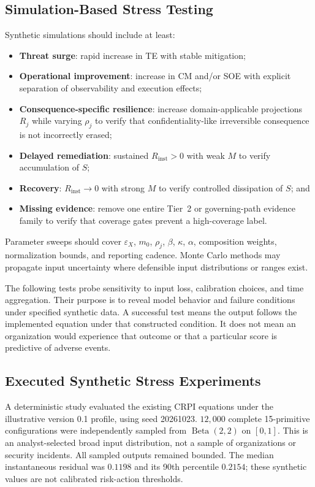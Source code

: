 \documentclass[11pt]{article}
\begin{document}
\subsection{Simulation-Based Stress Testing}
Synthetic simulations should include at least:
\begin{itemize}
  \item \textbf{Threat surge}: rapid increase in TE with stable mitigation;
  \item \textbf{Operational improvement}: increase in CM and/or SOE with explicit
    separation of observability and execution effects;
  \item \textbf{Consequence-specific resilience}: increase domain-applicable
    projections $R_j$ while varying $\rho_j$ to verify that confidentiality-like
    irreversible consequence is not incorrectly erased;
  \item \textbf{Delayed remediation}: sustained $R_{\mathrm{inst}}>0$ with weak $M$ to
    verify accumulation of $S$;
  \item \textbf{Recovery}: $R_{\mathrm{inst}}\rightarrow0$ with strong $M$ to verify
    controlled dissipation of $S$; and
  \item \textbf{Missing evidence}: remove one entire Tier~2 or governing-path evidence
    family to verify that coverage gates prevent a high-coverage label.
\end{itemize}

Parameter sweeps should cover $\varepsilon_X$, $m_0$, $\rho_j$, $\beta$, $\kappa$,
$\alpha$, composition weights, normalization bounds, and reporting cadence. Monte Carlo
methods may propagate input uncertainty where defensible input distributions or ranges
exist.

The following tests probe sensitivity to input loss, calibration
choices, and time aggregation. Their purpose is to reveal model
behavior and failure conditions under specified synthetic data.
A successful test means the output follows the implemented equation
under that constructed condition. It does not mean an organization
would experience that outcome or that a particular score is
predictive of adverse events.

\subsection{Executed Synthetic Stress Experiments}
\label{sec:executed-stress}

A deterministic study evaluated the existing CRPI equations under the
illustrative version 0.1 profile, using seed 20261023.
$12{,}000$ complete 15-primitive configurations were independently sampled
from $\operatorname{Beta}(2,2)$ on $[0,1]$. This is an analyst-selected broad
input distribution, not a sample of organizations or security incidents.
All sampled outputs remained bounded. The median instantaneous residual was
$0.1198$ and its 90th percentile $0.2154$; these synthetic values are not
calibrated risk-action thresholds.
\end{document}
